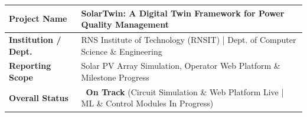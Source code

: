 \documentclass[11pt,a4paper]{article}
\newcommand{\statusgreen}{\textcolor{green!60!black}{\textbf{\textbullet\ On Track}}}
\newcommand{\tablehead}[1]{\textbf{#1}}
\begin{document}
\vspace{10pt}
\begin{table}[H]
    \renewcommand{\arraystretch}{1.4}
    \begin{tabularx}{\textwidth}{|l|X|}
    \hline
    \tablehead{Project Name} & SolarTwin: A Digital Twin Framework for Power Quality Management \\
    \hline
    \tablehead{Institution / Dept.} & RNS Institute of Technology (RNSIT) | Dept. of Computer Science \& Engineering \\
    \hline
    \tablehead{Reporting Scope} & Solar PV Array Simulation, Operator Web Platform \& Milestone Progress \\
    \hline
    \tablehead{Overall Status} & \statusgreen \hspace{2pt} (Circuit Simulation \& Web Platform Live | ML \& Control Modules In Progress) \\
    \hline
    \end{tabularx}
\end{table}

\vspace{-5pt}
\end{document}
